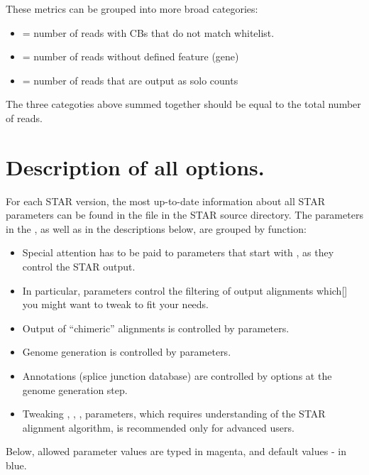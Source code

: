 \documentclass[12pt]{article}
\begin{document}
These metrics can be grouped into more broad categories:
\begin{itemize}
	\itemsep -0.3em
	\item[] = number of reads with CBs that do not match whitelist.
	\item[] = number of reads without defined feature (gene)
	\item[] = number of reads that are output as solo counts

\end{itemize}
The three categoties above summed together should be equal to the total number of reads.
	
\section{Description of all options.}\label{Description_of_all_options}
For each STAR version, the most up-to-date information about all STAR parameters can be found in the  file in the STAR source directory. The parameters in the , as well as in the descriptions below, are grouped by function:
\begin{itemize}
\item[] Special attention has to be paid to parameters that start with  , as they control the STAR output.
\item[] In particular,  parameters control the filtering of output alignments which[] you might want to tweak to fit your needs.
\item[] Output of “chimeric” alignments is controlled by  parameters.
\item[] Genome generation is controlled by  parameters.
\item[] Annotations (splice junction database) are controlled by  options at the genome generation step. 
\item[] Tweaking , ,  ,  parameters, which requires understanding of the STAR alignment algorithm, is recommended only for advanced users.
\end{itemize}

Below, allowed parameter values are typed in magenta, and default values - in blue.




\newcommand{\pright}[1]{\begin{flushright} \begin{minipage}{0.8\textwidth}\raggedright #1 \end{minipage} \end{flushright}}
\end{document}
